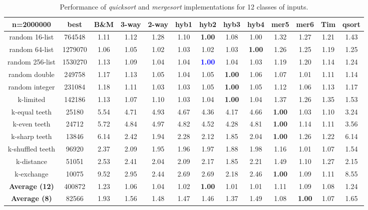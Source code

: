 \documentclass[AMA,STIX1COL]{WileyNJD-v2}
\newcommand{\qusort}{\emph{quicksort }}
\newcommand{\msort}{\emph{mergesort }}
\begin{document}
\begin{table}
\caption{Performance of \qusort and \msort implementations for 12 classes of inputs.}
\centering
\begin{tabular}{|c|c|c|c|c|c|c|c|c|c|c|c|c|}
\toprule
n=2000000 & best  & B\&M & 3-way & 2-way & hyb1 & hyb2 & hyb3 & hyb4 & mer5& mer6 & Tim & qsort \\
\midrule
random 16-list	&764548	&1.11&	1.12&	1.28&	1.10&	\textbf{1.00}&	1.08&	1.00&	1.32&	1.27&	1.21&	1.43\\
random 64-list&	1279070	&1.06	&1.05	&1.02	&1.03	&1.02	&1.03	&\textbf{1.00}	&1.26	&1.25	&1.19	&1.25\\
random 256-list&	1530270&	1.13&	1.09&	1.04&	1.04&	\textcolor{blue}{\textbf{1.00}}&	1.04&	1.03&	1.19&	1.20&	1.14&	1.24\\
random double&	249758	&1.17	&1.13	&1.05	&1.04	&1.05	&\textbf{1.00}	&1.06	&1.07	&1.01	&1.11	&1.14\\
random integer&	231084&	1.18&	1.11&	1.03&	1.03&	1.05&	\textbf{1.00}&	1.05&	1.12&	1.06&	1.13&	1.17\\
k-limited&	142186	&1.13	&1.07	&1.10	&1.03	&1.04	&\textbf{1.00}	&1.04	&1.37	&1.26	&1.35	&1.53\\
k-equal teeth&	25180&	5.54&	4.71&	4.93&	4.67&	4.36&	4.17&	4.66&	\textbf{1.00}&	1.03&	1.10&	3.24\\
k-even teeth&	24712	&5.72	&4.84	&4.97	&4.82	&4.52	&4.28	&4.81	&\textbf{1.00}	&1.14	&1.11&	3.56\\
k-sharp teeth&	13846	&6.14&	2.42&	1.94&	2.28&	2.12&	1.85&	2.04&	\textbf{1.00}&	1.26&	1.22&	6.14\\
k-shuffled teeth&	96920	&2.37	&2.09	&1.95	&1.96	&1.97	&1.88	&1.98	&1.16	&1.01	&1.07	&1.54\\
k-distance&	51051	&2.53&	2.41&	2.04&	2.09&	2.17&	1.85&	2.21&	1.49&	1.10&	1.27&	2.15\\
k-exchange&	10075	&9.52	&2.95	&2.44	&2.69	&2.69	&2.18	&2.46	&\textbf{1.00}	&1.09	&1.11	&8.55\\
\textbf{Average  (12)}&	400872&	1.23&	1.06&	1.04&	1.02&	\textbf{1.00}&	1.01&	1.01&	1.11&	1.09&	1.08&	1.24\\
\textbf{Average  (8)}&	82566	&1.93	&1.56	&1.48	&1.47	&1.46	&1.37	&1.49	&1.08	&\textbf{1.00}	&1.07	&1.65\\
\bottomrule
\end{tabular}
\label{table3}
\end{table}
\end{document}
